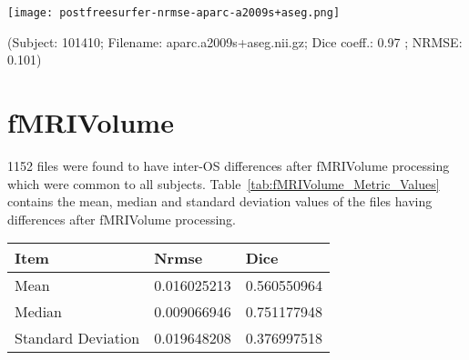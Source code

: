 \hfill \break
\begin{center}
\texttt{[image: postfreesurfer-nrmse-aparc-a2009s+aseg.png]}
\caption*{(Subject: 101410; Filename: aparc.a2009s+aseg.nii.gz; Dice coeff.: 0.97 ; NRMSE: 0.101)}
\label{fig:postfreesurfer_high_nrmse}
\end{center}

\section{fMRIVolume}\label{sec:fMRI}
1152 files were found to have inter-OS differences after fMRIVolume processing which were common to all subjects. Table~\ref{tab:fMRIVolume_Metric_Values} contains the mean, median and standard deviation values of the files having differences after fMRIVolume processing.
\hfill \break
\begin{center}
\begin{tabular}{|l|l|l|}
\hline
\textbf{Item}      & \textbf{Nrmse}  & \textbf{Dice} \\ \hline
Mean               & 0.016025213     & 0.560550964   \\ \hline
Median             & 0.009066946     & 0.751177948   \\ \hline
Standard Deviation & 0.019648208     & 0.376997518   \\ \hline
\end{tabular}
\label{tab:fMRIVolume_Metric_Values}
\end{center}
\hfill \break

